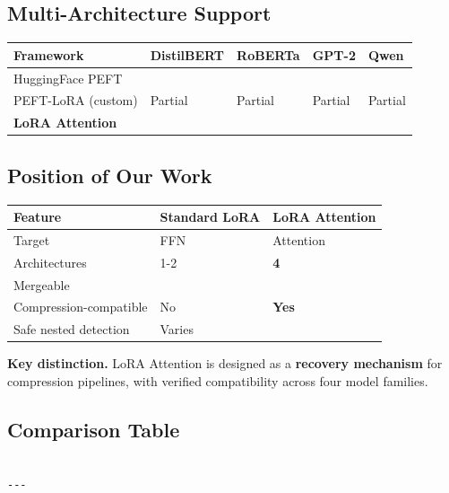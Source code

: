 \subsection{Multi-Architecture Support}

\begin{table}[H]
\centering
\small
\begin{tabular}{lllll}
\toprule
\textbf{Framework} & \textbf{DistilBERT} & \textbf{RoBERTa} & \textbf{GPT-2} & \textbf{Qwen} \\
\midrule
HuggingFace PEFT &  &  &  &  \\
PEFT-LoRA (custom) & Partial & Partial & Partial & Partial \\
\textbf{LoRA Attention} &  &  &  &  \\
\bottomrule
\end{tabular}
\end{table}

\subsection{Position of Our Work}

\begin{table}[H]
\centering
\small
\begin{tabular}{lll}
\toprule
\textbf{Feature} & \textbf{Standard LoRA} & \textbf{LoRA Attention} \\
\midrule
Target & FFN & Attention \\
Architectures & 1-2 & \textbf{4} \\
Mergeable &  &  \\
Compression-compatible & No & \textbf{Yes} \\
Safe nested detection & Varies &  \\
\bottomrule
\end{tabular}
\end{table}

\textbf{Key distinction.} LoRA Attention is designed as a \textbf{recovery mechanism} 
for compression pipelines, with verified compatibility across four model 
families.



\subsection{Comparison Table}

\begin{lstlisting}

---
\end{lstlisting}


